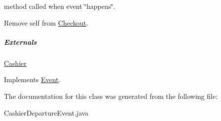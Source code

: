 method called when event \char`\"{}happens\char`\"{}. 

Remove self from \hyperlink{class_checkout}{Checkout}. \subparagraph*{Externals}

\hyperlink{class_cashier}{Cashier} 

Implements \hyperlink{class_event_fea360b9a95713e43cf3f9fa44150074}{Event}.

The documentation for this class was generated from the following file:\begin{CompactItemize}
\item 
CashierDepartureEvent.java\end{CompactItemize}
